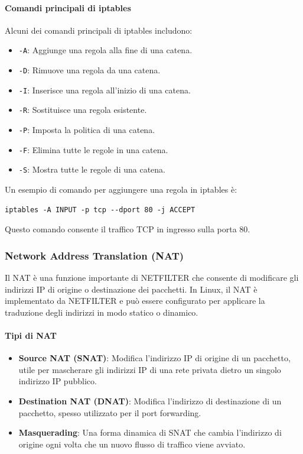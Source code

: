\paragraph{Comandi principali di iptables}
Alcuni dei comandi principali di iptables includono:
\begin{itemize}
  \item \texttt{-A}: Aggiunge una regola alla fine di una catena.
  \item \texttt{-D}: Rimuove una regola da una catena.
  \item \texttt{-I}: Inserisce una regola all'inizio di una catena.
  \item \texttt{-R}: Sostituisce una regola esistente.
  \item \texttt{-P}: Imposta la politica di una catena.
  \item \texttt{-F}: Elimina tutte le regole in una catena.
  \item \texttt{-S}: Mostra tutte le regole di una catena.
\end{itemize}

Un esempio di comando per aggiungere una regola in iptables è:
\begin{verbatim}
iptables -A INPUT -p tcp --dport 80 -j ACCEPT
\end{verbatim}
Questo comando consente il traffico TCP in ingresso sulla porta 80.

\subsubsection{Network Address Translation (NAT)}
Il NAT è una funzione importante di NETFILTER che consente di modificare gli indirizzi IP di origine o destinazione dei pacchetti. In Linux, il NAT è implementato da NETFILTER e può essere configurato per applicare la traduzione degli indirizzi in modo statico o dinamico.

\paragraph{Tipi di NAT}
\begin{itemize}
  \item \textbf{Source NAT (SNAT)}: Modifica l'indirizzo IP di origine di un pacchetto, utile per mascherare gli indirizzi IP di una rete privata dietro un singolo indirizzo IP pubblico.
  \item \textbf{Destination NAT (DNAT)}: Modifica l'indirizzo di destinazione di un pacchetto, spesso utilizzato per il port forwarding.
  \item \textbf{Masquerading}: Una forma dinamica di SNAT che cambia l'indirizzo di origine ogni volta che un nuovo flusso di traffico viene avviato.
\end{itemize}

